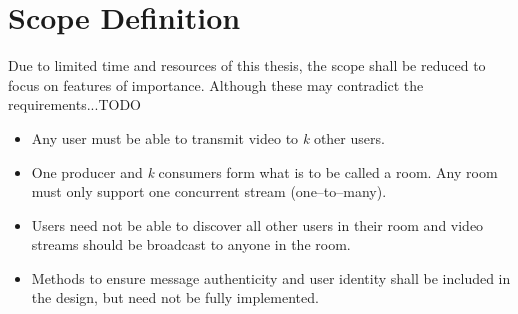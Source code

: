 \section{Scope Definition}

Due to limited time and resources of this thesis, the scope shall be reduced to focus on features of importance. Although these may contradict the requirements...TODO

\begin{itemize}
    \item Any user must be able to transmit video to \textit{k} other users.
    \item One producer and \textit{k} consumers form what is to be called a room. Any room must only support one concurrent stream (one–to–many).
    \item Users need not be able to discover all other users in their room and video streams should be broadcast to anyone in the room.
    \item Methods to ensure message authenticity and user identity shall be included in the design, but need not be fully implemented.
\end{itemize}

